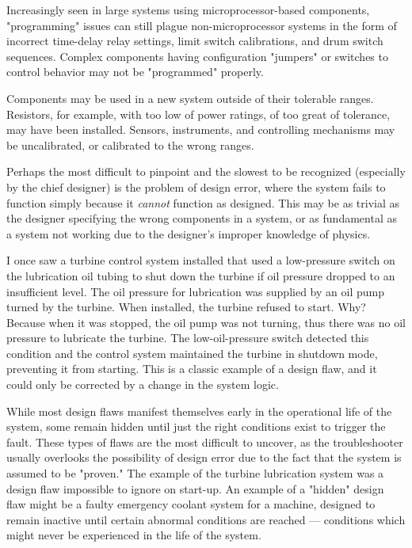 \stopsubsection

\startsubsection[title={Improper System
Configuration},reference={sec:xtocid157909723}]

Increasingly seen in large systems using microprocessor-based
components, "programming" issues can still plague non-microprocessor
systems in the form of incorrect time-delay relay settings, limit switch
calibrations, and drum switch sequences. Complex components having
configuration "jumpers" or switches to control behavior may not be
"programmed" properly.

Components may be used in a new system outside of their tolerable
ranges. Resistors, for example, with too low of power ratings, of too
great of tolerance, may have been installed. Sensors, instruments, and
controlling mechanisms may be uncalibrated, or calibrated to the wrong
ranges.

\stopsubsection

\startsubsection[title={Design Error},reference={sec:xtocid157909724}]

Perhaps the most difficult to pinpoint and the slowest to be recognized
(especially by the chief designer) is the problem of design error, where
the system fails to function simply because it {\em cannot} function as
designed. This may be as trivial as the designer specifying the wrong
components in a system, or as fundamental as a system not working due to
the designer's improper knowledge of physics.

I once saw a turbine control system installed that used a low-pressure
switch on the lubrication oil tubing to shut down the turbine if oil
pressure dropped to an insufficient level. The oil pressure for
lubrication was supplied by an oil pump turned by the turbine. When
installed, the turbine refused to start. Why? Because when it was
stopped, the oil pump was not turning, thus there was no oil pressure to
lubricate the turbine. The low-oil-pressure switch detected this
condition and the control system maintained the turbine in shutdown
mode, preventing it from starting. This is a classic example of a design
flaw, and it could only be corrected by a change in the system logic.

While most design flaws manifest themselves early in the operational
life of the system, some remain hidden until just the right conditions
exist to trigger the fault. These types of flaws are the most difficult
to uncover, as the troubleshooter usually overlooks the possibility of
design error due to the fact that the system is assumed to be "proven."
The example of the turbine lubrication system was a design flaw
impossible to ignore on start-up. An example of a "hidden" design flaw
might be a faulty emergency coolant system for a machine, designed to
remain inactive until certain abnormal conditions are reached ---
conditions which might never be experienced in the life of the system.

